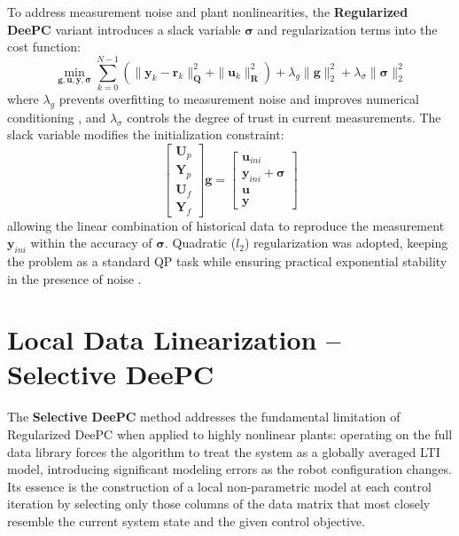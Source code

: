 To address measurement noise and plant nonlinearities, the \textbf{Regularized DeePC} variant \cite{deepc, ethzurich} introduces a slack variable $\boldsymbol{\sigma}$ and regularization terms into the cost function:
\begin{equation}
    \label{eq:regularized}
    \min_{\boldsymbol{g}, \boldsymbol{u}, \boldsymbol{y}, \boldsymbol{\sigma}} \sum_{k=0}^{N-1} \left( \| \boldsymbol{y}_k - \boldsymbol{r}_{k} \|_{\boldsymbol{Q}}^2 + \| \boldsymbol{u}_k \|_{\boldsymbol{R}}^2 \right) + \lambda_g \|\boldsymbol{g}\|_2^2 + \lambda_{\sigma} \|\boldsymbol{\sigma}\|^2_2
\end{equation}
where $\lambda_g$ prevents overfitting to measurement noise and improves numerical conditioning \cite{ethzurich, markovsky2023data}, and $\lambda_{\sigma}$ controls the degree of trust in current measurements. The slack variable modifies the initialization constraint:
\begin{equation}
\begin{bmatrix}
    \boldsymbol{U}_p \\
    \boldsymbol{Y}_p \\
    \boldsymbol{U}_f \\
    \boldsymbol{Y}_f
    \end{bmatrix}
    \boldsymbol{g} =
    \begin{bmatrix}
    \boldsymbol{u}_{ini} \\
    \boldsymbol{y}_{ini} + \boldsymbol{\sigma} \\
    \boldsymbol{u} \\
    \boldsymbol{y}
    \end{bmatrix}
    \label{eq:regularized_set}
\end{equation}
allowing the linear combination of historical data to reproduce the measurement $\boldsymbol{y}_{ini}$ within the accuracy of $\boldsymbol{\sigma}$. Quadratic ($l_2$) regularization was adopted, keeping the problem as a standard QP task while ensuring practical exponential stability in the presence of noise \cite{markovsky2023data}.

\section{Local Data Linearization -- Selective DeePC}
\label{sec:selective_deepc}

The \textbf{Selective DeePC} method \cite{choosewisely} addresses the fundamental limitation of Regularized DeePC when applied to highly nonlinear plants: operating on the full data library forces the algorithm to treat the system as a globally averaged LTI model, introducing significant modeling errors as the robot configuration changes. Its essence is the construction of a local non-parametric model at each control iteration by selecting only those columns of the data matrix that most closely resemble the current system state and the given control objective.

